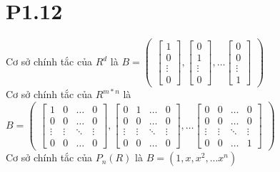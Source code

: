 \documentclass[a4paper,11pt]{article}
\theoremstyle{mytheor}
\begin{document}
\section*{P1.12}
Cơ sở chính tắc của $R^d$ là
$
B = \begin{pmatrix}
        \begin{bmatrix}
        1\\
        0\\
        \vdots\\
        0
        \end{bmatrix}
        ,
         \begin{bmatrix}
        0\\
        1\\
        \vdots\\
        0
        \end{bmatrix}
        ,\dots
         \begin{bmatrix}
        0\\
        0\\
        \vdots\\
        1
        \end{bmatrix}
    \end{pmatrix}
$
\\
Cơ sở chính tắc của $R^{m*n}$ là
$
B = \begin{pmatrix}
        \begin{bmatrix}
        1 & 0 & \dots & 0\\
        0 & 0 & \dots & 0\\
        \vdots & \vdots & \ddots & \vdots \\
        0 & 0 & \dots & 0
        \end{bmatrix}
        ,
        \begin{bmatrix}
        0 & 1 & \dots & 0\\
        0 & 0 & \dots & 0\\
        \vdots & \vdots & \ddots & \vdots \\
        0 & 0 & \dots & 0
        \end{bmatrix}
        ,\dots
         \begin{bmatrix}
        0 & 0 & \dots & 0\\
        0 & 0 & \dots & 0\\
        \vdots & \vdots & \ddots & \vdots \\
        0 & 0 & \dots & 1
        \end{bmatrix}
    \end{pmatrix}
$
\\
Cơ sở chính tắc của $P_n(R)$ là
$
B = ( 1,x,x^2,... x^n)
$
\end{document}
